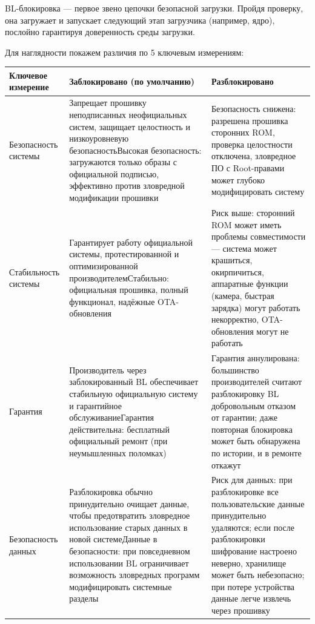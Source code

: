 
BL-блокировка — первое звено цепочки безопасной загрузки. Пройдя проверку, она загружает и запускает следующий этап загрузчика (например, ядро), послойно гарантируя доверенность среды загрузки.


Для наглядности покажем различия по 5 ключевым измерениям:

\begin{center}
\begin{tabularx}{\linewidth}{|X|X|X|}
\hline
\textbf{Ключевое измерение} & \textbf{Заблокировано (по умолчанию)} & \textbf{Разблокировано} \tabularnewline
\hline
Безопасность системы & Запрещает прошивку неподписанных неофициальных систем, защищает целостность и низкоуровневую безопасность\newline Высокая безопасность: загружаются только образы с официальной подписью, эффективно против зловредной модификации прошивки & Безопасность снижена: разрешена прошивка сторонних ROM, проверка целостности отключена, зловредное ПО с Root-правами может глубоко модифицировать систему \tabularnewline
Стабильность системы & Гарантирует работу официальной системы, протестированной и оптимизированной производителем\newline Стабильно: официальная прошивка, полный функционал, надёжные OTA-обновления & Риск выше: сторонний ROM может иметь проблемы совместимости — система может крашиться, окирпичиться, аппаратные функции (камера, быстрая зарядка) могут работать некорректно, OTA-обновления могут не работать \tabularnewline
Гарантия & Производитель через заблокированный BL обеспечивает стабильную официальную систему и гарантийное обслуживание\newline Гарантия действительна: бесплатный официальный ремонт (при неумышленных поломках) & Гарантия аннулирована: большинство производителей считают разблокировку BL добровольным отказом от гарантии; даже повторная блокировка может быть обнаружена по истории, и в ремонте откажут \tabularnewline
Безопасность данных & Разблокировка обычно принудительно очищает данные, чтобы предотвратить зловредное использование старых данных в новой системе\newline Данные в безопасности: при повседневном использовании BL ограничивает возможность зловредных программ модифицировать системные разделы & Риск для данных: при разблокировке все пользовательские данные принудительно удаляются; если после разблокировки шифрование настроено неверно, хранилище может быть небезопасно; при потере устройства данные легче извлечь через прошивку \tabularnewline

\end{tabularx}
\end{center}
